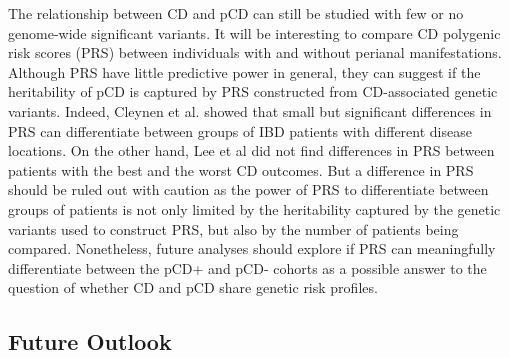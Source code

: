 The relationship between CD and pCD can still be studied with few or no genome-wide significant variants. It will be interesting to compare CD polygenic risk scores (PRS) between individuals with and without perianal manifestations. Although PRS have little predictive power in general, they can suggest if the heritability of pCD is captured by PRS constructed from CD-associated genetic variants. Indeed, Cleynen et al. \cite{Cleynen2016-ha} showed that small but significant differences in PRS can differentiate between groups of IBD patients with different disease locations. On the other hand, Lee et al \cite{Lee2017-tl} did not find differences in PRS between patients with the best and the worst CD outcomes. But a difference in PRS should be ruled out with caution as the power of PRS to differentiate between groups of patients is not only limited by the heritability captured by the genetic variants used to construct PRS, but also by the number of patients being compared. Nonetheless, future analyses should explore if PRS can meaningfully differentiate between the pCD+ and pCD- cohorts as a possible answer to the question of whether CD and pCD share genetic risk profiles.

\subsection{Future Outlook}





